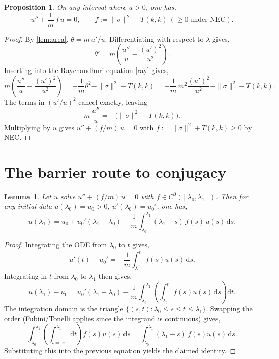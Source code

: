 \documentclass[a4paper, reqno]{amsart}
\numberwithin{equation}{section}
\theoremstyle{plain}
\newtheorem{proposition}[theorem]{Proposition}
\newtheorem{lemma}[theorem]{Lemma}
\theoremstyle{definition}
\theoremstyle{remark}
\newcommand{\dd}{\mathrm{d}}
\newcommand{\lamo}{\lambda_0}
\newcommand{\lamone}{\lambda_1}
\begin{document}
\begin{proposition}\label{prop:linear}
On any interval where $u>0$, one has,
$$u''+\frac{1}{m}\,f\,u=0,\qquad f:=\|\sigma\|^2+T(k,k)\ (\ge 0\ \text{under NEC}).$$
\end{proposition}
\begin{proof}
By \cref{lem:area}, $\theta=m\,u'/u$. Differentiating with respect to $\lambda$ gives,
$$ \theta' = m\left(\frac{u''}{u}-\frac{(u')^2}{u^2}\right). $$
Inserting into the Raychaudhuri equation \ref{ray} gives,
$$m\left(\frac{u''}{u}-\frac{(u')^2}{u^2}\right)
= -\frac{1}{m}\theta^2-\|\sigma\|^2-T(k,k)
= -\frac{1}{m}\,m^2\frac{(u')^2}{u^2}-\|\sigma\|^2-T(k,k).
$$
The terms in $(u'/u)^2$ cancel exactly, leaving
$$m\,\frac{u''}{u}= -\big(\|\sigma\|^2+T(k,k)\big).$$
Multiplying by $u$ gives $u''+(f/m)\ u=0$ with $f:=\|\sigma\|^2+T(k,k)\ge 0$ by NEC.

\end{proof}

\section{The barrier route to conjugacy}\label{sec:volterra}

\begin{lemma}\label{lem:volterra}
Let $u$ solve $u''+(f/m)\,u=0$ with $f\in C^0([\lamo,\lamone])$. Then for any initial data $u(\lamo)=u_0>0$, $u'(\lamo)=u_0'$, one has,
\begin{equation}\label{barrier}
    u(\lamone)=u_0+u_0'(\lamone-\lamo)-\frac{1}{m}\int_{\lamo}^{\lamone}(\lamone-s)\,f(s)\,u(s)\,\dd s.
\end{equation}
\end{lemma}
\begin{proof}
Integrating the ODE from $\lamo$ to $t$ gives,
$$u'(t)-u_0'=-\frac{1}{m}\int_{\lamo}^{t} f(s)u(s)\,\dd s.$$
Integrating in $t$ from $\lamo$ to $\lamone$ then gives,
$$u(\lamone)-u_0 = u_0'(\lamone-\lamo) - \frac{1}{m}\int_{\lamo}^{\lamone}\left(\int_{\lamo}^{t} f(s)u(s)\,\dd s\right)\dd t.$$
The integration domain is the triangle $\{(\!s,t): \lamo\le s\le t\le \lamone\}$. Swapping the order (Fubini/Tonelli applies since the integrand is continuous) gives,
$$\int_{\lamo}^{\lamone}\left(\int_{t=\;s}^{\lamone}\dd t\right) f(s)u(s)\,\dd s =\int_{\lamo}^{\lamone}(\lamone-s)\,f(s)u(s)\,\dd s.$$
Substituting this into the previous equation yields the claimed identity.

\end{proof}
\end{document}
